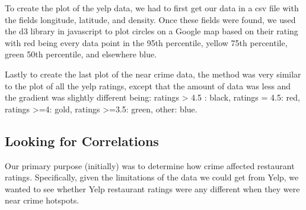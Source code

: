 \documentclass{article}
\begin{document}
To create the plot of the yelp data, we had to first get our data in a csv
file with the fields longitude, latitude, and density. Once these fields
were found, we used the d3 library in javascript to plot circles on a
Google map based on their rating with red being every data point in the
95th percentile, yellow 75th percentile, green 50th percentile, and
elsewhere blue.

Lastly to create the last plot of the near crime data, the method was very similar to the plot of all the yelp ratings, except that the amount of data was less and the gradient was slightly different being: ratings > 4.5 : black, ratings = 4.5: red, ratings >=4: gold, ratings >=3.5: green, other: blue.

\subsection{Looking for Correlations}

Our primary purpose (initially) was to determine how crime affected
restaurant ratings. Specifically, given the limitations of the data we
could get from Yelp, we wanted to see whether Yelp restaurant ratings were
any different when they were near crime hotspots.
\end{document}

